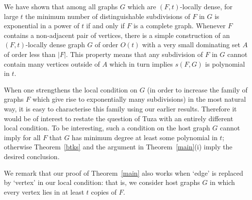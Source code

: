 \documentclass[12pt]{amsart}
\begin{document}
We have shown that among all graphs $G$ which are $(F,t)$-locally dense, for large $t$ the minimum number of distinguishable subdivisions of $F$ in $G$ is exponential in a power of $t$ if and only if $F$ is a complete graph.
Whenever $F$ contains a non-adjacent pair of vertices, there is a simple construction of an $(F,t)$-locally dense graph $G$ of order $O(t)$ with a very small dominating set $A$ of order less than $|F|$.
This property means that any subdivision of $F$ in $G$ cannot contain many vertices outside of $A$ which in turn implies $s(F,G)$ is polynomial in $t$.

When one strengthens the local condition on $G$ (in order to increase the family of graphs $F$ which give rise to exponentially many subdivisions) in the most natural way, it is easy to characterise this family using our earlier results.
Therefore it would be of interest to restate the question of Tuza with an entirely different local condition.
To be interesting, such a condition on the host graph $G$ cannot imply for all $F$ that $G$ has minimum degree at least some polynomial in $t$; otherwise Theorem~\ref{btks} and the argument in Theorem~\ref{main}(i) imply the desired conclusion.

We remark that our proof of Theorem~\ref{main} also works when `edge' is replaced by `vertex' in our local condition: that is, we consider host graphs $G$ in which every vertex lies in at least $t$ copies of $F$.
%

\end{document}

